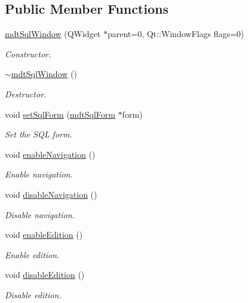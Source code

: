 \subsection*{Public Member Functions}
\begin{DoxyCompactItemize}
\item 
\hyperlink{classmdt_sql_window_a8624cc7a7a454e759c753c2faddd46e6}{mdtSqlWindow} (QWidget $\ast$parent=0, Qt::WindowFlags flags=0)
\begin{DoxyCompactList}\small\item\em Constructor. \end{DoxyCompactList}\item 
\hypertarget{classmdt_sql_window_a050588d255a48722438421b754b808f3}{
\hyperlink{classmdt_sql_window_a050588d255a48722438421b754b808f3}{$\sim$mdtSqlWindow} ()}
\label{classmdt_sql_window_a050588d255a48722438421b754b808f3}

\begin{DoxyCompactList}\small\item\em Destructor. \end{DoxyCompactList}\item 
void \hyperlink{classmdt_sql_window_ad9a237b7bea72d92a4743f09c28e38ae}{setSqlForm} (\hyperlink{classmdt_sql_form}{mdtSqlForm} $\ast$form)
\begin{DoxyCompactList}\small\item\em Set the SQL form. \end{DoxyCompactList}\item 
void \hyperlink{classmdt_sql_window_a6d4d853c8c64a99ff2e396b99ea63a87}{enableNavigation} ()
\begin{DoxyCompactList}\small\item\em Enable navigation. \end{DoxyCompactList}\item 
void \hyperlink{classmdt_sql_window_a961d587d63b0997a10db6728773a108f}{disableNavigation} ()
\begin{DoxyCompactList}\small\item\em Disable navigation. \end{DoxyCompactList}\item 
void \hyperlink{classmdt_sql_window_a42d1283a05eddd2a48af74cf764ef240}{enableEdition} ()
\begin{DoxyCompactList}\small\item\em Enable edition. \end{DoxyCompactList}\item 
void \hyperlink{classmdt_sql_window_a629fa57fcdde0e4db0fc93efd84c9123}{disableEdition} ()
\begin{DoxyCompactList}\small\item\em Disable edition. \end{DoxyCompactList}\end{DoxyCompactItemize}



